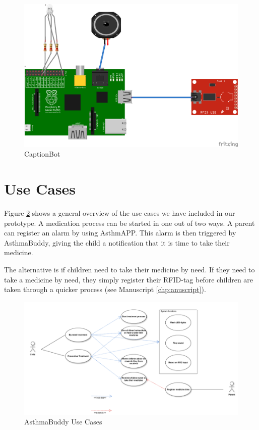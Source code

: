 \begin{figure}[H] 
	\centering
		\includegraphics[width=0.6\paperwidth]{Pictures/pi-fritzing-model.png}
	\caption{ CaptionBot }
	\label{fig:pi-fritzing}
\end{figure}
 

\section{Use Cases}
Figure \ref{fig:pi-use-cases} shows a general overview of the use cases we have included in our prototype. A medication process can be started in one out of two ways. 
A parent can register an alarm by using AsthmAPP. This alarm is then triggered by AsthmaBuddy, giving the child a notification that it is time to take their medicine.

The alternative is if children need to take their medicine by need. If they need to take a medicine by need, they simply register their RFID-tag before children are taken through a quicker process (see Manuscript \ref{chp:anuscript}).  

\begin{figure}[H] 
	\centering
		\includegraphics[width=0.8\paperwidth]{Pictures/usecases.png}
	\caption{AsthmaBuddy Use Cases}
	\label{fig:pi-use-cases}
\end{figure}

